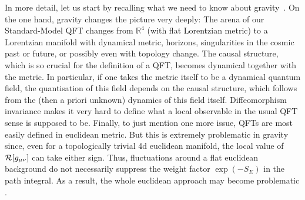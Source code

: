 \documentclass[12pt]{article}
\numberwithin{equation}{section}
\begin{document}
In more detail, let us start by recalling what we need to know about gravity~\cite{Wald:1984rg, wei, mtw, car, strau}. On the one hand, gravity changes the picture very deeply: The arena of our Standard-Model QFT changes from $\mathbb{R}^4$ (with flat Lorentzian metric) to a Lorentzian manifold with dynamical metric, horizons, singularities in the cosmic past or future, or possibly even with topology change. The causal structure, which is so crucial for the definition of a QFT, becomes dynamical together with the metric. In particular, if one takes the metric itself to be a dynamical quantum field, the quantisation of this field depends on the causal structure, which follows from the (then a priori unknown) dynamics of this field itself. Diffeomorphism invariance makes it very hard to define what a local observable in the usual QFT sense is supposed to be. Finally, to just mention one more issue, QFTs are most easily defined in euclidean metric. But this is extremely problematic in gravity since, even for a topologically trivial 4d euclidean manifold, the local value of ${\cal R}[g_{\mu\nu}]$ can take either sign. Thus, fluctuations around a flat euclidean background do not necessarily suppress the weight factor $\exp(-S_E)$ in the path integral. As a result, the whole euclidean approach may become problematic \cite{Gibbons:1978ac}.
\end{document}
